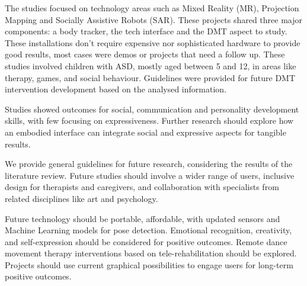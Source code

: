 \documentclass[a4paper,fleqn]{cas-sc}
\begin{document}
The studies focused on technology areas such as Mixed Reality (MR), Projection Mapping and Socially Assistive Robots (SAR). These projects shared three major components: a body tracker, the tech interface and the DMT aspect to study. These installations don't require expensive nor sophisticated hardware to provide good results, most cases were demos or projects that need a follow up.
These studies involved children with ASD, mostly aged between 5 and 12, in areas like therapy, games, and social behaviour. Guidelines were provided for future DMT intervention development based on the analysed information.

Studies showed outcomes for social, communication and personality development skills, with few focusing on expressiveness. %
Further research should explore how an embodied interface can integrate social and expressive aspects for tangible results.

We provide general guidelines for future research, considering the results of the literature review. Future studies should involve a wider range of users, inclusive design for therapists and caregivers, and collaboration with specialists from related disciplines like art and psychology.


Future technology should be portable, affordable, with updated sensors and Machine Learning models for pose detection. Emotional recognition, creativity, and self-expression should be considered for positive outcomes. Remote dance movement therapy interventions based on tele-rehabilitation should be explored. Projects should use current graphical possibilities to engage users for long-term positive outcomes.
\end{document}

